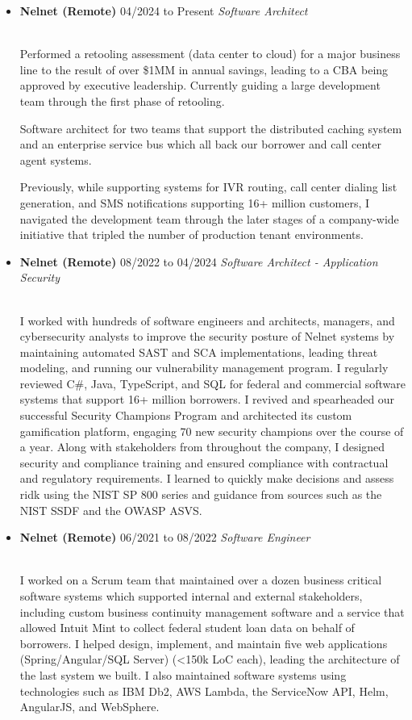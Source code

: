 \documentclass[11pt]{article}
\newcommand{\job}[3]{\vspace{1.5mm}
  \textbf{#1} \hfill #2 \linebreak \textit{#3}
}
\begin{document}
\begin{itemize}[leftmargin=*]
	\item[]
	      \job
	      {Nelnet (Remote)}
	      {04/2024 to Present}
	      {Software Architect}
               {\\Performed a retooling assessment (data center to cloud) for a major business line to the result of over \$1MM in annual savings, leading to a CBA being approved by executive leadership. Currently guiding a large development team through the first phase of retooling.\par
Software architect for two teams that support the distributed caching system and an enterprise service bus which all back our borrower and call center agent systems.\par
Previously, while supporting systems for IVR routing, call center dialing list generation, and SMS notifications supporting 16+ million customers, I navigated the development team through the later stages of a company-wide initiative that tripled the number of production tenant environments.}
	\item[]
	      \job
	      {Nelnet (Remote)}
	      {08/2022 to 04/2024}
	      {Software Architect - Application Security}
               {\\I worked with hundreds of software engineers and architects, managers, and cybersecurity analysts to improve the security posture of Nelnet systems by maintaining automated SAST and SCA implementations, leading threat modeling, and running our vulnerability management program. I regularly reviewed C\#, Java, TypeScript, and SQL for federal and commercial software systems that support 16+ million borrowers. I revived and spearheaded our successful Security Champions Program and architected its custom gamification platform, engaging 70 new security champions over the course of a year. Along with stakeholders from throughout the company, I designed security and compliance training and ensured compliance with contractual and regulatory requirements. I learned to quickly make decisions and assess ridk using the NIST SP 800 series and guidance from sources such as the NIST SSDF and the OWASP ASVS.}
	\item[]
	      \job
	      {Nelnet (Remote)}
	      {06/2021 to 08/2022}
	      {Software Engineer}
	      {\\I worked on a Scrum team that maintained over a dozen business critical software systems which supported internal and external stakeholders, including custom business continuity management software and a service that allowed Intuit Mint to collect federal student loan data on behalf of borrowers. I helped design, implement, and maintain five web applications (Spring/Angular/SQL Server) (<150k LoC each), leading the architecture of the last system we built. I also maintained software systems using technologies such as IBM Db2, AWS Lambda, the ServiceNow API, Helm, AngularJS, and WebSphere.\par
}
\end{itemize}
\end{document}
